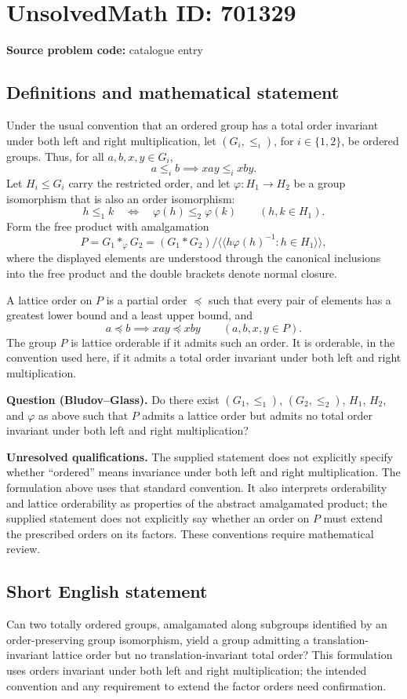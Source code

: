 \documentclass[11pt]{article}
\begin{document}
\section*{UnsolvedMath ID: 701329}
\textbf{Source problem code:} catalogue entry
\subsection{Definitions and mathematical statement}
Under the usual convention that an ordered group has a total order invariant under both left and right multiplication, let \((G_i,\leq_i)\), for \(i\in\{1,2\}\), be ordered groups. Thus, for all \(a,b,x,y\in G_i\),
\[
a\leq_i b\implies xay\leq_i xby.
\]
Let \(H_i\leq G_i\) carry the restricted order, and let \(\varphi:H_1\to H_2\) be a group isomorphism that is also an order isomorphism:
\[
h\leq_1 k\quad\Longleftrightarrow\quad\varphi(h)\leq_2\varphi(k)\qquad(h,k\in H_1).
\]
Form the free product with amalgamation
\[
P=G_1*_{\varphi}G_2
=(G_1*G_2)\big/\big\langle\!\big\langle h\varphi(h)^{-1}:h\in H_1\big\rangle\!\big\rangle,
\]
where the displayed elements are understood through the canonical inclusions into the free product and the double brackets denote normal closure.

A lattice order on \(P\) is a partial order \(\preccurlyeq\) such that every pair of elements has a greatest lower bound and a least upper bound, and
\[
a\preccurlyeq b\implies xay\preccurlyeq xby\qquad(a,b,x,y\in P).
\]
The group \(P\) is lattice orderable if it admits such an order. It is orderable, in the convention used here, if it admits a total order invariant under both left and right multiplication.

\textbf{Question (Bludov--Glass).} Do there exist \((G_1,\leq_1)\), \((G_2,\leq_2)\), \(H_1\), \(H_2\), and \(\varphi\) as above such that \(P\) admits a lattice order but admits no total order invariant under both left and right multiplication?

\textbf{Unresolved qualifications.} The supplied statement does not explicitly specify whether ``ordered'' means invariance under both left and right multiplication. The formulation above uses that standard convention. It also interprets orderability and lattice orderability as properties of the abstract amalgamated product; the supplied statement does not explicitly say whether an order on \(P\) must extend the prescribed orders on its factors. These conventions require mathematical review.
\subsection{Short English statement}
Can two totally ordered groups, amalgamated along subgroups identified by an order-preserving group isomorphism, yield a group admitting a translation-invariant lattice order but no translation-invariant total order? This formulation uses orders invariant under both left and right multiplication; the intended convention and any requirement to extend the factor orders need confirmation.
\end{document}

